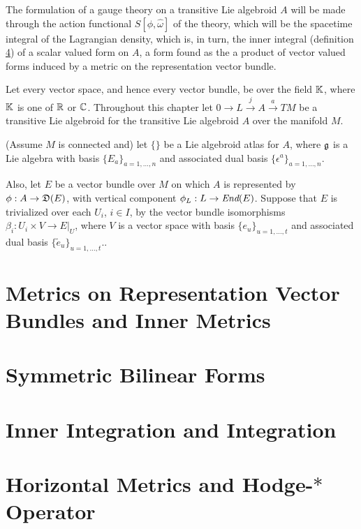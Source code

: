 The formulation of a gauge theory on a transitive Lie algebroid $A$ will be made through the action functional $S[\phi, \hat \omega]$ of the theory, which will be the spacetime integral of the Lagrangian density, which is, in turn, the inner integral (definition \ref{}) of a scalar valued form on $A$, a form found as the a product of vector valued forms induced by a metric on the representation vector bundle.

Let every vector space, and hence every vector bundle, be over the field $\mathbb{K}$, where $\mathbb{K}$ is one of $\mathbb{R}$ or $\mathbb{C}$. Throughout this chapter let $0 \to L \xrightarrow{j} A \xrightarrow{a} TM$ be a transitive Lie algebroid for the transitive Lie algebroid $A$ over the manifold $M$.

(Assume $M$ is connected and) let $\{\}$ be a Lie algebroid atlas for $A$, where $\mathfrak{g}$ is a Lie algebra with basis $\{E_a\}_{a = 1, \dots, n}$ and associated dual basis $\{\epsilon^a\}_{a = 1, \dots, n}$.

Also, let $E$ be a vector bundle over $M$ on which $A$ is represented by $\phi: A \to \alg D(E)$, with vertical component $\phi_L: L \to \End(E)$. Suppose that $E$ is trivialized over each $U_i$, $i \in I$, by the vector bundle isomorphisms $\beta_i: U_i \times V \to E|_U$, where $V$ is a vector space with basis $\{e_u\}_{u = 1, \dots, t}$ and associated dual basis $\{\tilde e_u\}_{u = 1, \dots, t}$..

\section{Metrics on Representation Vector Bundles and Inner Metrics}

\begin{definition}
    
\end{definition}


\section{Symmetric Bilinear Forms}



\section{Inner Integration and Integration}

\section{Horizontal Metrics and Hodge-$*$ Operator}

